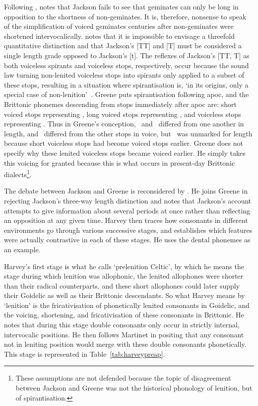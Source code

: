 Following \textcite{martinet_celtic_1952}, \textcite{greene_gemination_1956} notes that Jackson fails to see that geminates can only be long in opposition to the shortness of non-geminates. It is, therefore, nonsense to speak of the simplification of voiced geminates centuries after non-geminates were shortened intervocalically. \Textcite{Gre_Spirant66} notes that it is impossible to envisage a threefold quantitative distinction  and that Jackson's [TT] and [T] must be considered a single length grade opposed to Jackson's [t]. The  reflexes of Jackson's [TT, T] as both voiceless spirants and voiceless stops, respectively, occur because the sound law turning non-lenited voiceless stops into spirants  only applied to a subset of these stops, resulting in a situation where spirantisation is, `in its origins, only a special case of non-lenition'~\autocite[119]{Gre_Spirant66}. Greene puts spirantisation following \gls{apoc}, and the Brittonic phonemes descending from stops immediately after \gls{apoc} are: short voiced stops representing \lT, long voiced stops representing \xD, and voiceless stops representing \xT. Thus in Greene's conception, \lT\ and \xD\ differed from one another in length, and \xT\ differed from the other stops in voice, but \xT\ was unmarked for length because short voiceless stops had become voiced stops earlier. Greene does not specify why these lenited voiceless stops became voiced earlier. He simply takes this voicing for granted because this is what occurs in present-day Brittonic dialects\footnote{These assumptions are not defended because the topic of disagreement between Jackson and Greene was not the historical phonology of lenition, but of spirantisation.}.


The debate between Jackson and Greene is reconsidered by \textcite{harvey_aspects_1984}. He joins Greene in rejecting Jackson's three-way length distinction and notes that Jackson's account attempts to give information about several periods at once rather than reflecting an opposition at any given time. Harvey then traces how consonants in different environments go through various successive stages, and establishes which features were actually contrastive in each of these stages. He uses the dental phonemes as an example.

Harvey's first stage is what he calls `prelenition Celtic', by which he means the stage during which lenition was allophonic, the lenited allophones were shorter than their radical counterparts,  and these short allophones could later supply their Goidelic as well as their Brittonic descendants. So what Harvey means by `lenition' is the fricativisation of phonetically lenited consonants in Goidelic, and the voicing, shortening, and fricativisation of these consonants in Brittonic. He notes that during this stage double consonants only occur in strictly internal, intervocalic positions. He then follows Martinet in positing that any consonant not in leniting position would merge with these double consonants phonetically. This stage is represented in Table~\ref{tab:harveypreap}.

